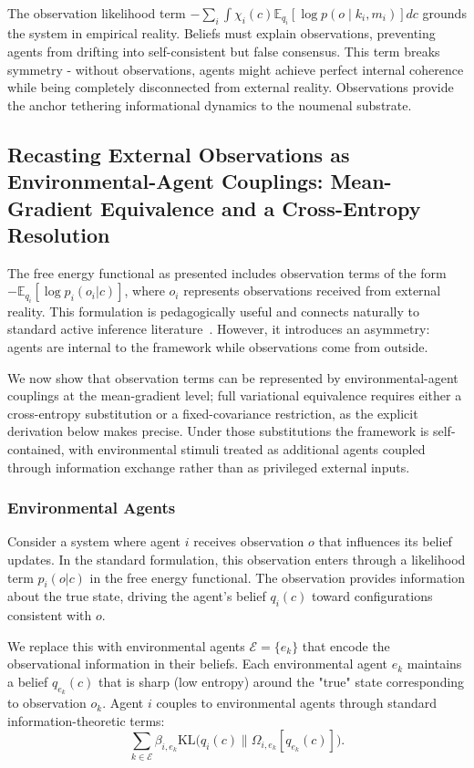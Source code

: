 \documentclass[11pt]{article}
\begin{document}
The observation likelihood term $-\sum_i \int \chi_i(c)  \mathbb{E}_{q_i}[\log p(o \mid k_i, m_i)]  dc$ grounds the system in empirical reality. Beliefs must explain observations, preventing agents from drifting into self-consistent but false consensus. This term breaks symmetry - without observations, agents might achieve perfect internal coherence while being completely disconnected from external reality. Observations provide the anchor tethering informational dynamics to the noumenal substrate.

\subsection{Recasting External Observations as Environmental-Agent Couplings: Mean-Gradient Equivalence and a Cross-Entropy Resolution}

The free energy functional as presented includes observation terms of the form $-\mathbb{E}_{q_i}[\log p_i(o_i|c)]$, where $o_i$ represents observations received from external reality. This formulation is pedagogically useful and connects naturally to standard active inference literature~\cite{Friston2010, parr2022active}. However, it introduces an asymmetry: agents are internal to the framework while observations come from outside.

We now show that observation terms can be represented by environmental-agent couplings at the mean-gradient level; full variational equivalence requires either a cross-entropy substitution or a fixed-covariance restriction, as the explicit derivation below makes precise. Under those substitutions the framework is self-contained, with environmental stimuli treated as additional agents coupled through information exchange rather than as privileged external inputs.

\subsubsection{Environmental Agents}

Consider a system where agent $i$ receives observation $o$ that influences its belief updates. In the standard formulation, this observation enters through a likelihood term $p_i(o|c)$ in the free energy functional. The observation provides information about the true state, driving the agent's belief $q_i(c)$ toward configurations consistent with $o$.

We replace this with environmental agents $\mathcal{E} = \{e_k\}$ that encode the observational information in their beliefs. Each environmental agent $e_k$ maintains a belief $q_{e_k}(c)$ that is sharp (low entropy) around the "true" state corresponding to observation $o_k$. Agent $i$ couples to environmental agents through standard information-theoretic terms:
\begin{equation}
\sum_{k \in \mathcal{E}} \beta_{i,e_k}  \mathrm{KL}\big(q_i(c) \| \Omega_{i,e_k}[q_{e_k}(c)]\big).
\end{equation}
\end{document}
